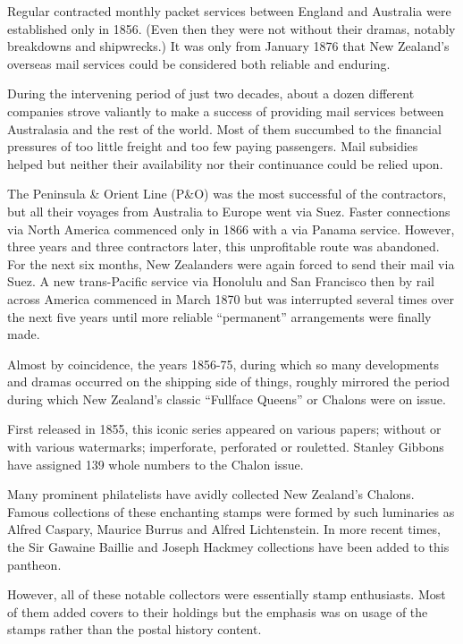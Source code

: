 \documentclass[justified]{tufte-book}
\begin{document}
Regular contracted monthly packet services between England and Australia were established only in 1856.  (Even then they were not without their dramas, notably breakdowns and shipwrecks.)  It was only from January 1876 that New Zealand’s overseas mail services could be considered both reliable and enduring.

During the intervening period of just two decades, about a dozen different companies strove valiantly to make a success of providing mail services between Australasia and the rest of the world.  Most of them succumbed to the financial pressures of too little freight and too few paying passengers.  Mail subsidies helped but neither their availability nor their continuance could be relied upon.

The Peninsula \& Orient Line (P\&O) was the most successful of the contractors, but all their voyages from Australia to Europe went via Suez.  Faster connections via North America commenced only in 1866 with a via Panama service.  However, three years and three contractors later, this unprofitable route was abandoned.  For the next six months, New Zealanders were again forced to send their mail via Suez.  A new trans-Pacific service via Honolulu and San Francisco then by rail across America commenced in March 1870 but was interrupted several times over the next five years until more reliable ``permanent'' arrangements were finally made.

Almost by coincidence, the years 1856-75, during which so many developments and dramas occurred on the shipping side of things, roughly mirrored the period during which New Zealand’s classic ``Fullface Queens'' or Chalons were on issue.

First released in 1855, this iconic series appeared on various papers; without or with various watermarks; imperforate, perforated or rouletted.  Stanley Gibbons have assigned 139 whole numbers to the Chalon issue.

Many prominent philatelists have avidly collected New Zealand’s Chalons.  Famous collections of these enchanting stamps were formed by such luminaries as Alfred Caspary, Maurice Burrus and Alfred Lichtenstein.  In more recent times, the Sir Gawaine Baillie and Joseph Hackmey collections have been added to this pantheon.

However, all of these notable collectors were essentially stamp enthusiasts.  Most of them added covers to their holdings but the emphasis was on usage of the stamps rather than the postal history content.
\end{document}
